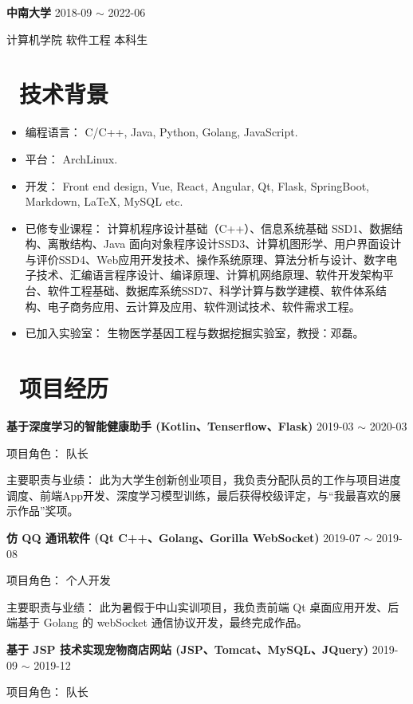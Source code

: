 \documentclass[12pt, a4paper]{article}
\begin{document}
\textbf{中南大学} \hfill 2018-09 $\sim$ 2022-06

计算机学院 \quad 软件工程 \quad 本科生

\section{\color{CVBlue}\faCogs\ 技术背景}
\begin{itemize}[parsep=0.5ex]
  \item 编程语言： C/C++, Java, Python, Golang, JavaScript.
  \item 平台： ArchLinux.
  \item 开发： Front end design, Vue, React, Angular, Qt, Flask, SpringBoot, Markdown, LaTeX, MySQL etc.
  \item 已修专业课程： 计算机程序设计基础（C++）、信息系统基础 SSD1、数据结构、离散结构、Java 面向对象程序设计SSD3、计算机图形学、用户界面设计与评价SSD4、Web应用开发技术、操作系统原理、算法分析与设计、数字电子技术、汇编语言程序设计、编译原理、计算机网络原理、软件开发架构平台、软件工程基础、数据库系统SSD7、科学计算与数学建模、软件体系结构、电子商务应用、云计算及应用、软件测试技术、软件需求工程。
  \item 已加入实验室： 生物医学基因工程与数据挖掘实验室，教授：邓磊。
\end{itemize}

\section{\color{CVBlue}\faUsers\ 项目经历}

\textbf{基于深度学习的智能健康助手 (Kotlin、Tenserflow、Flask)} \hfill 2019-03 $\sim$ 2020-03

项目角色： \quad 队长

主要职责与业绩： \quad 此为大学生创新创业项目，我负责分配队员的工作与项目进度调度、前端App开发、深度学习模型训练，最后获得校级评定，与``我最喜欢的展示作品''奖项。

\textbf{仿 QQ 通讯软件 (Qt C++、Golang、Gorilla WebSocket)} \hfill 2019-07 $\sim$ 2019-08

项目角色： \quad 个人开发

主要职责与业绩： \quad 此为暑假于中山实训项目，我负责前端 Qt 桌面应用开发、后端基于 Golang 的 webSocket 通信协议开发，最终完成作品。

\textbf{基于 JSP 技术实现宠物商店网站 (JSP、Tomcat、MySQL、JQuery)} \hfill 2019-09 $\sim$ 2019-12

项目角色： \quad 队长
\end{document}
